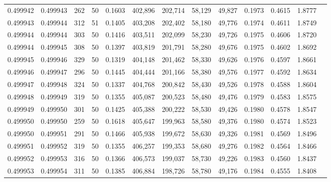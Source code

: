 \begin{tabular}{rrrrrrrrrrrrr}
0.499942 & 0.499943 & 262 &  50 &                                     0.1603 & 402,896 & 202,714 &  58,129 &  49,827 & 0.1973 & 0.4615 & 1.8777 \\
0.499943 & 0.499944 & 312 &  51 &                                     0.1405 & 403,208 & 202,402 &  58,180 &  49,776 & 0.1974 & 0.4611 & 1.8749 \\
0.499944 & 0.499944 & 303 &  50 &                                     0.1416 & 403,511 & 202,099 &  58,230 &  49,726 & 0.1975 & 0.4606 & 1.8720 \\
0.499944 & 0.499945 & 308 &  50 &                                     0.1397 & 403,819 & 201,791 &  58,280 &  49,676 & 0.1975 & 0.4602 & 1.8692 \\
0.499945 & 0.499946 & 329 &  50 &                                     0.1319 & 404,148 & 201,462 &  58,330 &  49,626 & 0.1976 & 0.4597 & 1.8661 \\
0.499946 & 0.499947 & 296 &  50 &                                     0.1445 & 404,444 & 201,166 &  58,380 &  49,576 & 0.1977 & 0.4592 & 1.8634 \\
0.499947 & 0.499948 & 324 &  50 &                                     0.1337 & 404,768 & 200,842 &  58,430 &  49,526 & 0.1978 & 0.4588 & 1.8604 \\
0.499948 & 0.499949 & 319 &  50 &                                     0.1355 & 405,087 & 200,523 &  58,480 &  49,476 & 0.1979 & 0.4583 & 1.8575 \\
0.499949 & 0.499950 & 301 &  50 &                                     0.1425 & 405,388 & 200,222 &  58,530 &  49,426 & 0.1980 & 0.4578 & 1.8547 \\
0.499950 & 0.499950 & 259 &  50 &                                     0.1618 & 405,647 & 199,963 &  58,580 &  49,376 & 0.1980 & 0.4574 & 1.8523 \\
0.499950 & 0.499951 & 291 &  50 &                                     0.1466 & 405,938 & 199,672 &  58,630 &  49,326 & 0.1981 & 0.4569 & 1.8496 \\
0.499951 & 0.499952 & 319 &  50 &                                     0.1355 & 406,257 & 199,353 &  58,680 &  49,276 & 0.1982 & 0.4564 & 1.8466 \\
0.499952 & 0.499953 & 316 &  50 &                                     0.1366 & 406,573 & 199,037 &  58,730 &  49,226 & 0.1983 & 0.4560 & 1.8437 \\
0.499953 & 0.499954 & 311 &  50 &                                     0.1385 & 406,884 & 198,726 &  58,780 &  49,176 & 0.1984 & 0.4555 & 1.8408 \\

\end{tabular}
